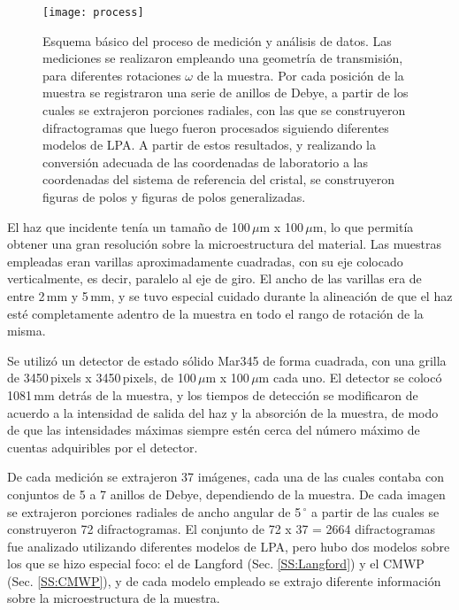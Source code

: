 \begin{figure}[!htb]
  \centering
  \texttt{[image: process]}
  \caption{Esquema básico del proceso de medición y análisis de datos. Las mediciones se realizaron empleando una geometría de transmisión, para diferentes rotaciones $\omega$ de la muestra. Por cada posición de la muestra se registraron una serie de anillos de Debye, a partir de los cuales se extrajeron porciones radiales, con las que se construyeron difractogramas que luego fueron procesados siguiendo diferentes modelos de LPA. A partir de estos resultados, y realizando la conversión adecuada de las coordenadas de laboratorio a las coordenadas del sistema de referencia del cristal, se construyeron figuras de polos y figuras de polos generalizadas.}
  \label{fig:transmision}
\end{figure}


El haz que incidente tenía un tamaño de 100\,$\mu$m x 100\,$\mu$m, lo que permitía obtener una gran resolución sobre la microestructura del material.
Las muestras empleadas eran varillas aproximadamente cuadradas, con su eje colocado verticalmente, es decir, paralelo al eje de giro.
El ancho de las varillas era de entre 2\,mm y 5\,mm, y se tuvo especial cuidado durante la alineación de que el haz esté completamente adentro de la muestra en todo el rango de rotación de la misma.

Se utilizó un detector de estado sólido Mar345 de forma cuadrada, con una grilla de 3450\,pixels x 3450\,pixels, de 100\,$\mu$m x 100\,$\mu$m cada uno.
El detector se colocó 1081\,mm detrás de la muestra, y los tiempos de detección se modificaron de acuerdo a la intensidad de salida del haz y la absorción de la muestra, de modo de que las intensidades máximas siempre estén cerca del número máximo de cuentas adquiribles por el detector.

De cada medición se extrajeron 37 imágenes, cada una de las cuales contaba con conjuntos de 5 a 7 anillos de Debye, dependiendo de la muestra.
De cada imagen se extrajeron porciones radiales de ancho angular de 5\,$^{\circ}$ a partir de las cuales se construyeron 72 difractogramas.
El conjunto de 72 x 37 = 2664 difractogramas fue analizado utilizando diferentes modelos de LPA, pero hubo dos modelos sobre los que se hizo especial foco: el de Langford (Sec. \ref{SS:Langford}) y el CMWP (Sec. \ref{SS:CMWP}), y de cada modelo empleado se extrajo diferente información sobre la microestructura de la muestra.

